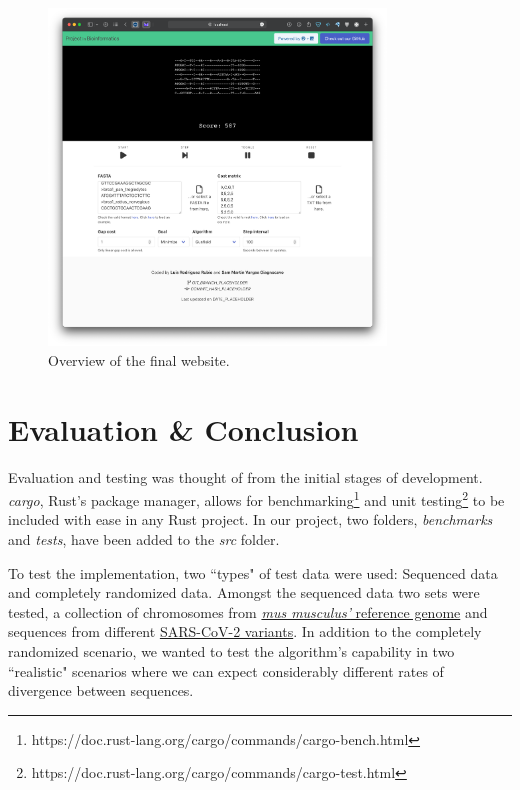 \documentclass[twoside,openright,titlepage,numbers=noenddot,headinclude,%
                footinclude=true,cleardoublepage=empty,abstractoff, %
                BCOR=5mm,paper=a4,fontsize=11pt,%
                ngerman,american,%
                ]{scrreprt}
\begin{document}
\begin{figure}[h]
    \includegraphics[width=0.8\textwidth]{webapp.png}
    \centering
    \caption{Overview of the final website.}
    \label{fig:webapp}
\end{figure}

\chapter{Evaluation \& Conclusion}
\label{cha:evaluation}

Evaluation and testing was thought of from the initial stages of development. \textit{cargo}, Rust's package manager, allows for benchmarking\footnote{https://doc.rust-lang.org/cargo/commands/cargo-bench.html} and unit testing\footnote{https://doc.rust-lang.org/cargo/commands/cargo-test.html} to be included with ease in any Rust project. In our project, two folders, \textit{benchmarks} and \textit{tests}, have been added to the \textit{src} folder.

To test the implementation, two ``types" of test data were used: Sequenced data and completely randomized data. Amongst the sequenced data two sets were tested, a collection of chromosomes from \href{https://www.ncbi.nlm.nih.gov/assembly/GCF_000001635.27/}{\textit{mus musculus'} reference genome} and sequences from different \href{https://viralzone.expasy.org/9556}{SARS-CoV-2 variants}. In addition to the completely randomized scenario, we wanted to test the algorithm's capability in two ``realistic" scenarios where we can expect considerably different rates of divergence between sequences.
\end{document}
